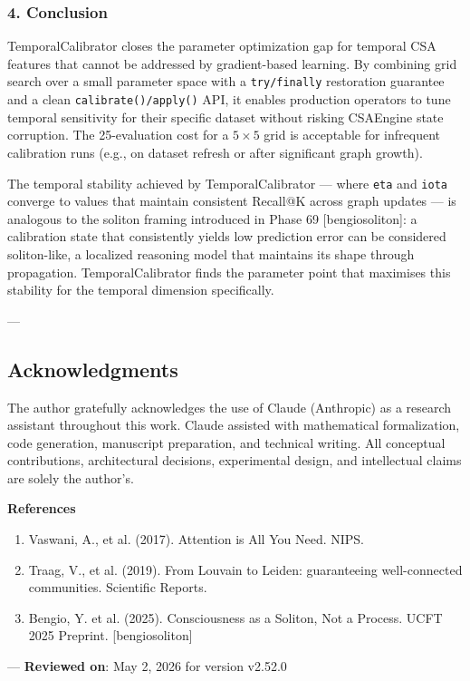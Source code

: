 \subsubsection{4. Conclusion}
TemporalCalibrator closes the parameter optim\-ization gap for temporal CSA features that cannot be addressed by gradient-based learning. By combining grid search over a small parameter space with a \texttt{try/finally} restoration guarantee and a clean \texttt{calibrate()/apply()} API, it enables production operators to tune temporal sensitivity for their specific dataset without risking CSAEngine state corruption. The 25-evaluation cost for a $5 \times 5$ grid is acceptable for infrequent calibration runs (e.g., on dataset refresh or after significant graph growth).

The temporal stability achieved by TemporalCalibrator — where \texttt{eta} and \texttt{iota} converge to values that maintain consistent Recall@K across graph updates — is analogous to the soliton framing introduced in Phase 69 [bengio\-soliton]: a calibration state that consi\-stently yields low prediction error can be considered soliton-like, a localized reasoning model that maintains its shape through propagation. TemporalCalibrator finds the parameter point that maximises this stability for the temporal dimension speci\-fically.

---
\subsection{Acknow\-ledgments}

The author gratefully ackno\-wledges the use of Claude (Anthropic) as a research assistant throughout this work. Claude assisted with mathe\-matical forma\-lization, code generation, manuscript preparation, and technical writing. All conceptual contr\-ibutions, archi\-tectural decisions, exper\-imental design, and intel\-lectual claims are solely the author's.

\textbf{References}
\begin{enumerate}
\item Vaswani, A., et al. (2017). Attention is All You Need. NIPS.
\item Traag, V., et al. (2019). From Louvain to Leiden: guara\-nteeing well-connected communities. Scientific Reports.
\item Bengio, Y. et al. (2025). Consci\-ousness as a Soliton, Not a Process. UCFT 2025 Preprint. [bengio\-soliton]

\end{enumerate}
---
\textbf{Reviewed on}: May 2, 2026 for version v2.52.0
